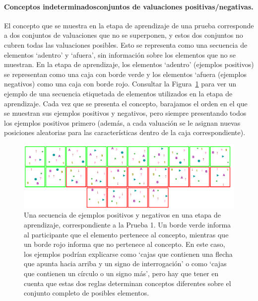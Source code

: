 \paragraph{Conceptos indeterminados\textemdash conjuntos de valuaciones positivas/negativas.} \label{IncompleteConcepts} El concepto que se muestra en la etapa de aprendizaje de una prueba corresponde a dos conjuntos de valuaciones que no se superponen, y estos dos conjuntos no cubren todas las valuaciones posibles. Esto se representa como una secuencia de elementos `adentro' y `afuera', sin información sobre los elementos que no se muestran. En la etapa de aprendizaje, los elementos `adentro' (ejemplos positivos) se representan como una caja con borde verde y los elementos `afuera (ejemplos negativos) como una caja con borde rojo. Consultar la Figura~\ref{Figure:training} para ver un ejemplo de una secuencia etiquetada de elementos utilizados en la etapa de aprendizaje. Cada vez que se presenta el concepto, barajamos el orden en el que se muestran sus ejemplos positivos y negativos, pero siempre presentando todos los ejemplos positivos primero (además, a cada valuación se le asignan nuevas posiciones aleatorias para las características dentro de la caja correspondiente).

\begin{figure}[h!] 
\begin{center}
    \includegraphics[scale=0.35]{../figuras/brm/Learning.PNG}
	\caption{
	Una secuencia de ejemplos positivos y negativos en una etapa de aprendizaje, correspondiente a la Prueba 1. Un borde verde informa al participante que el elemento pertenece al concepto, mientras que un borde rojo informa que no pertenece al concepto. En este caso, los ejemplos podrían explicarse como `cajas que contienen una flecha que apunta hacia arriba y un signo de interrogación' o como `cajas que contienen un círculo o un signo más', pero hay que tener en cuenta que estas dos reglas determinan conceptos diferentes sobre el conjunto completo de posibles elementos.}
	\label{Figure:training}
\end{center}
\end{figure}

